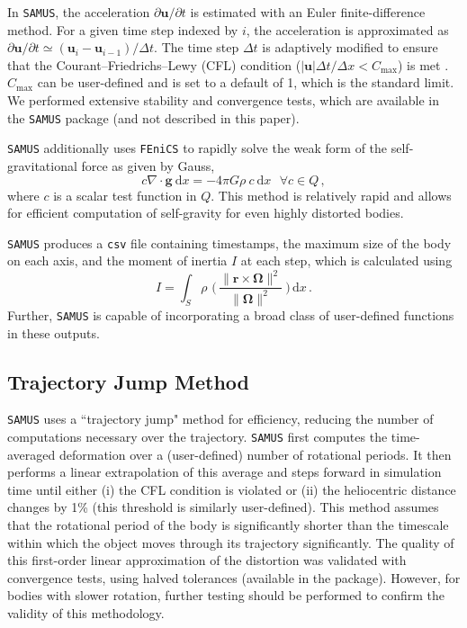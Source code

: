 \documentclass[twocolumn,doublespacing]{aastex631}
\begin{document}
In \texttt{SAMUS}, the acceleration $\partial\boldsymbol{u}/\partial t$ is estimated with an Euler finite-difference method. For a given time step indexed by $i$, the acceleration is approximated as $\partial\boldsymbol{u}/\partial t\simeq(\boldsymbol{u}_i-\boldsymbol{u}_{i-1})/\Delta t$. The time step $\Delta t$ is adaptively modified to ensure that the Courant–Friedrichs–Lewy (CFL) condition ($|\boldsymbol{u}|\Delta t/\Delta x<C_{\text{max}}$) is met \citep{CFL}. $C_{\text{max}}$ can be user-defined and is set to a default of 1, which is the standard limit. We performed extensive stability and convergence tests, which are available in the \texttt{SAMUS} package (and not described in this paper).

\texttt{SAMUS} additionally uses \texttt{FEniCS} to rapidly solve the weak form of the self-gravitational force as given by Gauss, 
\begin{equation}\label{eq:gaussgrav}
    c\nabla\cdot\boldsymbol{g}\ \text{d}x=-4\pi G\rho\ c\ \text{d}x\ \ \ \forall c\in Q\,,
\end{equation}
where $c$ is a scalar test function in $Q$. This method is relatively rapid and allows for efficient computation of self-gravity for even highly distorted bodies.
 
\texttt{SAMUS} produces a \verb|csv| file containing timestamps, the maximum size of the body on each axis, and the moment of inertia $I$ at each step, which is calculated using
\begin{equation}\label{eq:MOI}
    I=\int_S\rho\,\,\bigg(\,\frac{\|\boldsymbol{r}\times\boldsymbol{\Omega}\|^2}{\|\boldsymbol{\Omega}\|^2}\ \bigg)\, \text{d}x\,.
\end{equation}
Further, \texttt{SAMUS} is capable of incorporating a broad class of user-defined functions in these outputs.
 
 \subsection{Trajectory Jump Method}\label{subsec:trajjump}
 
\texttt{SAMUS} uses a ``trajectory jump" method for efficiency, reducing the number of computations necessary over the trajectory. \texttt{SAMUS} first computes the time-averaged deformation over a (user-defined) number of rotational periods. It then performs a linear extrapolation of this average and steps forward in simulation time until either (i) the CFL condition is violated or (ii) the heliocentric distance changes by 1\% (this threshold is similarly user-defined). This method assumes that the rotational period of the body is significantly shorter than the timescale within which the object moves through its trajectory significantly. The quality of this first-order linear approximation of the distortion was validated with convergence tests, using halved tolerances (available in the package). However, for bodies with slower rotation, further testing should be performed to confirm the validity of this methodology.
 
\end{document}
